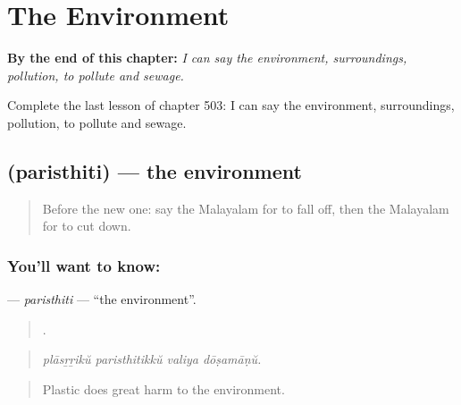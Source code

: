 
\chapter{The Environment}
\label{ch:ml-the-environment}

\begin{chapteropening}
\textbf{By the end of this chapter:} \emph{I can say the environment, surroundings, pollution, to pollute and sewage.}

Complete the last lesson of chapter 503: I can say the environment, surroundings, pollution, to pollute and sewage.
\end{chapteropening}

\section[\texorpdfstring{\ml{പരിസ്ഥിതി} (paristhiti)}{പരിസ്ഥിതി (paristhiti)}]{ (paristhiti) — the environment}

\label{lesson:ML-C503-paristhiti}



\begin{quote}
Before the new one: say the Malayalam for to fall off, then the Malayalam for to cut down.
\end{quote}

\subsection*{You'll want to know: }
\textbf{} — \emph{paristhiti} — \textquotedblleft{}the environment\textquotedblright{}.

\begin{quote}
   .
\end{quote}

\begin{quote}
\emph{plāsṟṟikŭ paristhitikkŭ valiya dōṣamāṇŭ.}
\end{quote}

\begin{quote}
Plastic does great harm to the environment.
\end{quote}

